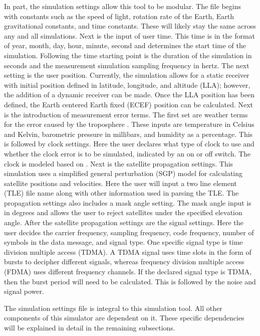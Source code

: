 \documentclass[12pt]{report}
\begin{document}
In part, the simulation settings allow this tool to be modular. The file begins with constants such as the speed of light, rotation rate of the Earth, Earth gravitational constants, and time constants. These will likely stay the same across any and all simulations. Next is the input of user time. This time is in the format of year, month, day, hour, minute, second and determines the start time of the simulation. Following the time starting point is the duration of the simulation in seconds and the measurement simulation sampling frequency in hertz. The next setting is the user position. Currently, the simulation allows for a static receiver with initial position defined in latitude, longitude, and altitude (LLA); however, the addition of a dynamic receiver can be made. Once the LLA position has been defined, the Earth centered Earth fixed (ECEF) position can be calculated. Next is the introduction of measurement error terms. The first set are weather terms for the error caused by the troposphere \cite{misraGlobalPositioningSystem2012}. These inputs are temperature in Celsius and Kelvin, barometric pressure in millibars, and humidity as a percentage. This is followed by clock settings. Here the user declares what type of clock to use and whether the clock error is to be simulated, indicated by an on or off switch. The clock is modeled based on \cite{brown_introduction_2012}. Next is the satellite propagation settings. This simulation uses a simplified general perturbation (SGP) model for calculating satellite positions and velocities. Here the user will input a two line element (TLE) file name along with other information used in parsing the TLE. The propagation settings also includes a mask angle setting. The mask angle input is in degrees and allows the user to reject  satellites under the specified elevation angle. After the satellite propagation settings are the signal settings. Here the user decides the carrier frequency, sampling frequency, code frequency, number of symbols in the data message, and signal type. One specific signal type is time division multiple access (TDMA). A TDMA signal uses time slots in the form of bursts to decipher different signals, whereas frequency division multiple access (FDMA) uses different frequency channels. If the declared signal type is TDMA, then the burst period will need to be calculated. This is followed by the noise and signal power.

The simulation settings file is integral to this simulation tool. All other components of this simulator are dependent on it. These specific dependencies will be explained in detail in the remaining subsections.
\end{document}
